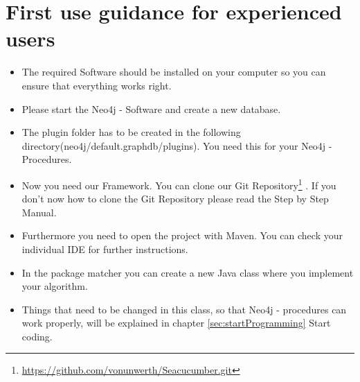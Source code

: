\section {First use guidance for experienced users} \label{sec:beforeFirstUse}
\begin{itemize}
	\item The required Software should be installed on your computer so you can ensure that everything works right.
	\item Please start the Neo4j - Software and create a new database. 
	\item The plugin folder has to be created in the following directory(neo4j/default.graphdb/plugins). You need this for your \glqq  Neo4j - Procedures\grqq{}.
	\item Now you need our Framework. You can clone our \glqq Git Repository\footnote{\url{https://github.com/vonunwerth/Seacucumber.git}} \grqq{}. If you don't now how to clone the \glqq Git Repository\grqq{} please read the Step by Step Manual.
	\item Furthermore you need to open the project with Maven. You can check your individual IDE for further instructions.
	\item In the package \glqq matcher\grqq{} you can create a new Java class where you implement your algorithm.
	\item Things that need to be changed in this class, so that \glqq Neo4j - procedures\grqq{} can work properly, will be explained in chapter \ref{sec:startProgramming} \glqq Start coding\grqq{}. 
\end{itemize}

